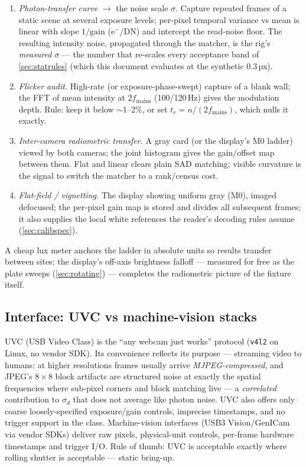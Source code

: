 \documentclass[11pt]{article}
\theoremstyle{definition}
\newcommand{\code}[1]{\texttt{#1}}
\begin{document}
\begin{enumerate}
  \item \emph{Photon-transfer curve} $\to$ the noise scale $\sigma$.
        Capture repeated frames of a static scene at several exposure
        levels; per-pixel temporal variance vs mean is linear with slope
        $1/\text{gain}$ (e$^-$/DN) and intercept the read-noise floor.
        The resulting intensity noise, propagated through the matcher,
        is the rig's \emph{measured} $\sigma$ --- the number that
        re-scales every acceptance band of \autoref{sec:statrules}
        (which this document evaluates at the synthetic $0.3$\,px).
  \item \emph{Flicker audit.} High-rate (or exposure-phase-swept)
        capture of a blank wall; the FFT of mean intensity at
        $2f_{\text{mains}}$ (100/120\,Hz) gives the modulation depth.
        Rule: keep it below $\sim$1--2\%, or set
        $t_e = n/(2f_{\text{mains}})$, which nulls it exactly.
  \item \emph{Inter-camera radiometric transfer.} A gray card (or the
        display's M0 ladder) viewed by both cameras; the joint
        histogram gives the gain/offset map between them. Flat and
        linear clears plain SAD matching; visible curvature is the
        signal to switch the matcher to a rank/census cost.
  \item \emph{Flat-field / vignetting.} The display showing uniform
        gray (M0), imaged defocused; the per-pixel gain map is stored
        and divides all subsequent frames; it also supplies the local
        white references the reader's decoding rules assume
        (\autoref{sec:calibspec}).
\end{enumerate}

A cheap lux meter anchors the ladder in absolute units so results
transfer between sites; the display's off-axis brightness falloff ---
measured for free as the plate sweeps (\autoref{sec:rotating}) ---
completes the radiometric picture of the fixture itself.

\subsection{Interface: UVC vs machine-vision stacks}
\label{sec:uvc}

UVC (USB Video Class) is the ``any webcam just works'' protocol
(\code{v4l2} on Linux, no vendor SDK). Its convenience reflects its
purpose --- streaming video to humans: at higher resolutions frames
usually arrive \emph{MJPEG-compressed}, and JPEG's $8\times8$ block
artifacts are structured noise at exactly the spatial frequencies where
sub-pixel corners and block matching live --- a \emph{correlated}
contribution to $\sigma_d$ that does not average like photon noise. UVC
also offers only coarse loosely-specified exposure/gain controls,
imprecise timestamps, and no trigger support in the class. Machine-vision
interfaces (USB3 Vision/GenICam via vendor SDKs) deliver raw pixels,
physical-unit controls, per-frame hardware timestamps and trigger I/O.
Rule of thumb: UVC is acceptable exactly where rolling shutter is
acceptable --- static bring-up.
\end{document}

